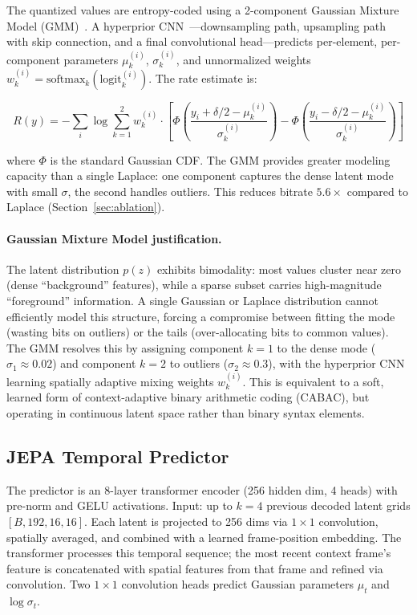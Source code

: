\documentclass{article}
\begin{document}
The quantized values are entropy-coded using a 2-component Gaussian Mixture Model (GMM)~\cite{cheng2020gmm}. A hyperprior CNN~\cite{minnen2018joint}---downsampling path, upsampling path with skip connection, and a final convolutional head---predicts per-element, per-component parameters $\mu_k^{(i)}$, $\sigma_k^{(i)}$, and unnormalized weights $w_k^{(i)} = \text{softmax}_k(\text{logit}_k^{(i)})$. The rate estimate is:

\begin{equation}
\label{eq:rate}
R(y) = -\sum_{i} \log \sum_{k=1}^2 w_k^{(i)} \cdot \left[ \Phi\left(\frac{y_i + \delta/2 - \mu_k^{(i)}}{\sigma_k^{(i)}}\right) - \Phi\left(\frac{y_i - \delta/2 - \mu_k^{(i)}}{\sigma_k^{(i)}}\right) \right]
\end{equation}

where $\Phi$ is the standard Gaussian CDF. The GMM provides greater modeling capacity than a single Laplace: one component captures the dense latent mode with small $\sigma$, the second handles outliers. This reduces bitrate $5.6{\times}$ compared to Laplace (Section~\ref{sec:ablation}).

\paragraph{Gaussian Mixture Model justification.}
The latent distribution $p(z)$ exhibits bimodality: most values cluster near zero (dense ``background'' features), while a sparse subset carries high-magnitude ``foreground'' information. A single Gaussian or Laplace distribution cannot efficiently model this structure, forcing a compromise between fitting the mode (wasting bits on outliers) or the tails (over-allocating bits to common values). The GMM resolves this by assigning component $k{=}1$ to the dense mode ($\sigma_1 \approx 0.02$) and component $k{=}2$ to outliers ($\sigma_2 \approx 0.3$), with the hyperprior CNN learning spatially adaptive mixing weights $w_k^{(i)}$. This is equivalent to a soft, learned form of context-adaptive binary arithmetic coding (CABAC), but operating in continuous latent space rather than binary syntax elements.

\subsection{JEPA Temporal Predictor}

The predictor is an 8-layer transformer encoder (256 hidden dim, 4 heads) with pre-norm and GELU activations. Input: up to $k{=}4$ previous decoded latent grids $[B, 192, 16, 16]$. Each latent is projected to 256 dims via $1{\times}1$ convolution, spatially averaged, and combined with a learned frame-position embedding. The transformer processes this temporal sequence; the most recent context frame's feature is concatenated with spatial features from that frame and refined via convolution. Two $1{\times}1$ convolution heads predict Gaussian parameters $\mu_t$ and $\log \sigma_t$.
\end{document}
